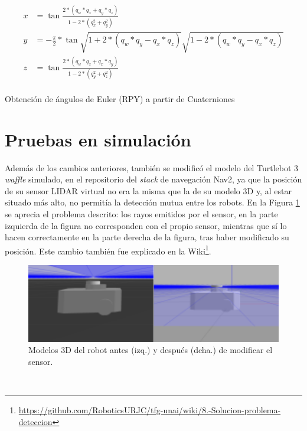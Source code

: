 \begin{myequation}[h!]
  \begin{equation}
  \begin{aligned}
  x &= \tan{\frac{2 * (q_w*q_x + q_y*q_z)}{1 - 2 * (q_x^2 + q_y^2)}}  \\
  y &= -\frac{\pi}{2} * \tan{\sqrt{1 + 2 * (q_w * q_y - q_x * q_z)}}{\sqrt{1 - 2 * (q_w * q_y - q_x * q_z)}}  \\
  z &= \tan{\frac{2 * (q_w * q_z + q_x * q_y)}{1 - 2 * (q_y^2 + q_z^2)}}  \\
  \end{aligned}
  \label{ec:euler_to_quat}
  \end{equation}
  \caption[Obtención de ángulos de Euler (RPY) a partir de Cuaterniones]{Obtención de ángulos de Euler (RPY) a partir de Cuaterniones}
\end{myequation}



\section{Pruebas en simulación}
\label{sec:pruebas_sim}

Además de los cambios anteriores, también se modificó el modelo del Turtlebot 3
\textit{waffle} simulado, en el repositorio del \textit{stack} de navegación
Nav2, ya que la posición de su sensor LIDAR virtual no era la misma que la de su
modelo 3D y, al estar situado más alto, no permitía la detección mutua entre los
robots.
En la Figura \ref{fig:mutua_deteccion} se aprecia el problema descrito: los
rayos emitidos por el sensor, en la parte izquierda de la figura no corresponden
con el propio sensor, mientras que sí lo hacen correctamente en la parte derecha
de la figura, tras haber modificado su posición.
Este cambio también fue explicado en la Wiki\footnote{
\href{https://github.com/RoboticsURJC/tfg-unai/wiki/8.-Soluci\%C3\%B3n-del-problema-de-mutua-detecci\%C3\%B3n-de-los-Turtlebot3-\%5B28-Jun---29-Jul\%5D}{https://github.com/RoboticsURJC/tfg-unai/wiki/8.-Solucion-problema-deteccion}}.

\begin{figure} [h!]
  \begin{center}
    \includegraphics[width=12cm]{figs/turtlebot_model_mods}
  \end{center}
  \caption{Modelos 3D del robot antes (izq.) y después (dcha.) de modificar el sensor.}
  \label{fig:mutua_deteccion}
\end{figure}\

